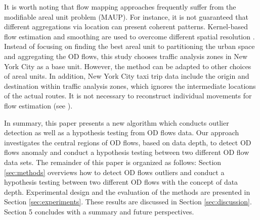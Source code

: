 \documentclass[a4paper,UKenglish]{lipics-v2016}
\begin{document}
It is worth noting that flow mapping approaches frequently suffer from the modifiable areal unit problem (MAUP). For instance, it is not guaranteed that different aggregations via location can present coherent patterns.
Kernel-based flow estimation and smoothing are used to overcome different spatial resolution \cite{guo14IEEETVCG}. 
Instead of focusing on finding the best areal unit to partitioning the urban space and aggregating the OD flows, this study chooses traffic analysis zones in New York City as a base unit. However, the method can be adapted to other choices of areal units.
In addition, New York City taxi trip data include the origin and destination within traffic analysis zones, which ignores the intermediate locations of the actual routes.
It is not necessary to reconstruct individual movements for flow estimation (see \cite{duckham16ICGIS}).

In summary, this paper presents a new algorithm which conducts outlier detection as well as a hypothesis testing from OD flows data. Our approach investigates the central regions of OD flows, based on data depth, to detect OD flows anomaly and conduct a hypothesis testing between two different OD flow data sets. The remainder of this paper is organized as follows: Section \ref{sec:methods} overviews how to detect OD flows outliers and conduct  a hypothesis testing between two different OD flows with the concept of data depth. 
Experimental design and the evaluation of the methods are presented in Section \ref{sec:experiments}. 
These results are discussed in Section \ref{sec:discussion}. 
Section 5 concludes with a summary and future perspectives.

%
\end{document}

